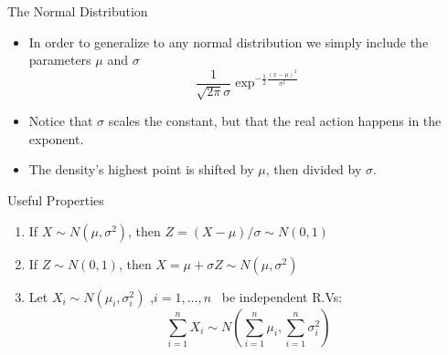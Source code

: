 \documentclass[handout]{beamer}
\begin{document}
\begin{frame}{The  Normal Distribution}

\scriptsize{
\begin{itemize}
 \item In order to generalize to any normal distribution we simply include the parameters $\mu$ and $\sigma$
 \begin{displaymath}
 \frac{1}{\sqrt{2\pi}\sigma}\exp^{-\frac{1}{2}\frac{(x-\mu)^2}{\sigma^{2}}} 
 \end{displaymath}
 \item Notice that $\sigma$ scales the constant, but that the real action happens in the exponent. 
 \item The density's highest point is shifted by $\mu$, then divided by $\sigma$. 
\end{itemize}

\begin{block}{Useful Properties}
\begin{enumerate}
 \item If $X \sim N(\mu, \sigma^2)$, then $Z=(X-\mu)/\sigma \sim N(0,1)$
 \item If $Z \sim N(0,1)$, then $X=\mu+\sigma Z \sim N(\mu, \sigma^2)$
 \item Let $X_{i} \sim N(\mu_{i},\sigma_{i}^{2})$ ,$i=1,\dots,n$ \  be independent R.Vs:
 \begin{displaymath}
  \sum_{i=1}^{n}X_{i}\sim N( \sum_{i=1}^{n}\mu_{i}, \sum_{i=1}^{n}\sigma_{i}^{2})
 \end{displaymath}

 
\end{enumerate}
 
\end{block}
}
\end{frame}
\end{document}
